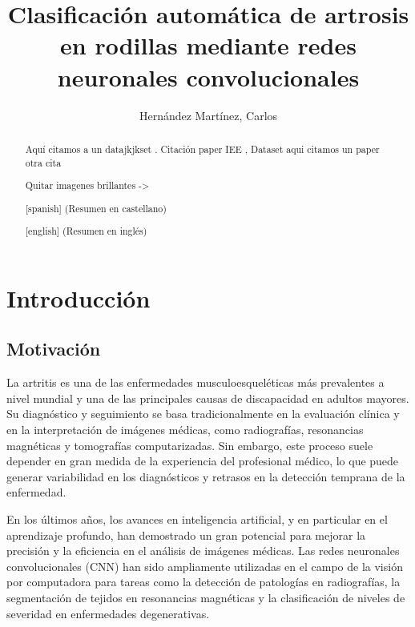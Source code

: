 \documentclass[11pt,spanish,listoffigures,listoftables]{tfgetsinf}
\title{Clasificación automática de artrosis en rodillas mediante redes neuronales convolucionales}
\author{Hernández Martínez, Carlos}
\begin{document}

\begin{abstract}
Aquí citamos a un datajkjkset \cite{gornale2020digital}.
Citación paper IEE \cite{10863523}, Dataset \cite{chen2018knee}
aqui citamos un paper \cite{VAATTOVAARA2025100580}
otra cita \cite{comprehensive_review}

Quitar imagenes brillantes -> \cite{efficientnet_paper}
\end{abstract}

\begin{abstract}[spanish]
(Resumen en castellano)
\end{abstract}

\begin{abstract}[english]
(Resumen en inglés)
\end{abstract}

\mainmatter


\chapter{Introducción}  %

\section{Motivación}     %
La artritis es una de las enfermedades musculoesqueléticas más prevalentes a nivel mundial y una de las principales causas de discapacidad en adultos mayores. Su diagnóstico y seguimiento se basa tradicionalmente en la evaluación clínica y en la interpretación de imágenes médicas, como radiografías, resonancias magnéticas y tomografías computarizadas. Sin embargo, este proceso suele depender en gran medida de la experiencia del profesional médico, lo que puede generar variabilidad en los diagnósticos y retrasos en la detección temprana de la enfermedad.

En los últimos años, los avances en inteligencia artificial, y en particular en el aprendizaje profundo, han demostrado un gran potencial para mejorar la precisión y la eficiencia en el análisis de imágenes médicas. Las redes neuronales convolucionales (CNN) han sido ampliamente utilizadas en el campo de la visión por computadora para tareas como la detección de patologías en radiografías, la segmentación de tejidos en resonancias magnéticas y la clasificación de niveles de severidad en enfermedades degenerativas.
\end{document}
